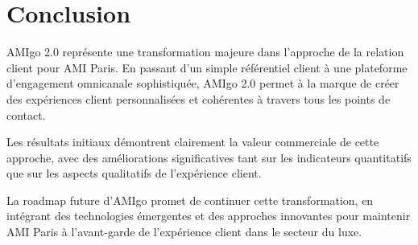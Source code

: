 \section{Conclusion}

AMIgo 2.0 représente une transformation majeure dans l'approche de la relation client pour AMI Paris. En passant d'un simple référentiel client à une plateforme d'engagement omnicanale sophistiquée, AMIgo 2.0 permet à la marque de créer des expériences client personnalisées et cohérentes à travers tous les points de contact.

Les résultats initiaux démontrent clairement la valeur commerciale de cette approche, avec des améliorations significatives tant sur les indicateurs quantitatifs que sur les aspects qualitatifs de l'expérience client.

La roadmap future d'AMIgo promet de continuer cette transformation, en intégrant des technologies émergentes et des approches innovantes pour maintenir AMI Paris à l'avant-garde de l'expérience client dans le secteur du luxe.

